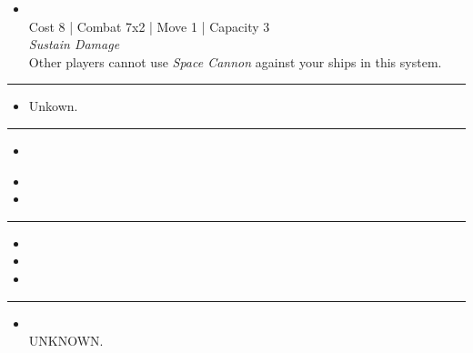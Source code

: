 \begin{multicols}{2}

\begin{itemize}
\item {}\\
Cost 8 | Combat 7x2 | Move 1 | Capacity 3 \\
\emph{Sustain Damage}\\
Other players cannot use \emph{Space Cannon} against your ships in this system.
\end{itemize}

\vspace{-10pt}\rule{\hsize}{0.4pt}\vspace{5pt}


\begin{itemize}
\item Unkown. %
\end{itemize}

\vspace{-10pt}\rule{\hsize}{0.4pt}\vspace{5pt}


\begin{itemize}
\item \strikeWingI
\end{itemize}

\columnbreak
{}

\begin{itemize}
\item \strikeWingII
\item \hololattice
\end{itemize}

\vspace{-10pt}\rule{\hsize}{0.4pt}\vspace{5pt}


\begin{itemize}
\item {}
\item {} 
\item {}
\end{itemize}

\vspace{-10pt}\rule{\hsize}{0.4pt}\vspace{5pt}


\begin{itemize}
\item {}\\
UNKNOWN.
\end{itemize}

\end{multicols}



